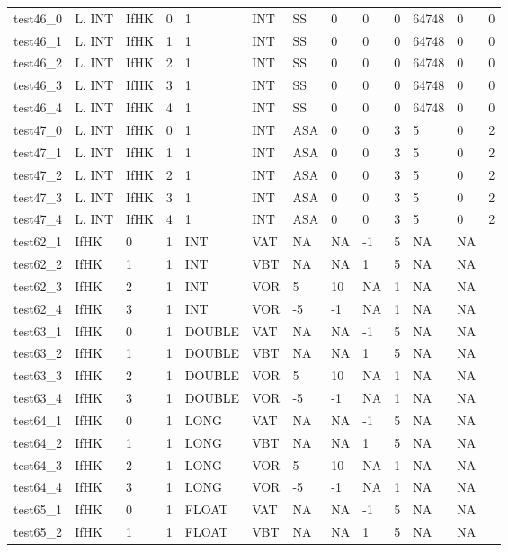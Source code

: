 \begin{longtable}{|l|l|l|p{0.5cm}|p{0.5cm}|l|p{0.5cm}|p{0.5cm}|p{0.5cm}|l|l|p{0.5cm}|l|}
test46\_0 & L. INT & IfHK & 0 & 1 & INT & SS & 0 & 0 & 0 & 64748 & 0 & 0 \\
test46\_1 & L. INT & IfHK & 1 & 1 & INT & SS & 0 & 0 & 0 & 64748 & 0 & 0 \\
test46\_2 & L. INT & IfHK & 2 & 1 & INT & SS & 0 & 0 & 0 & 64748 & 0 & 0 \\
test46\_3 & L. INT & IfHK & 3 & 1 & INT & SS & 0 & 0 & 0 & 64748 & 0 & 0 \\
test46\_4 & L. INT & IfHK & 4 & 1 & INT & SS & 0 & 0 & 0 & 64748 & 0 & 0 \\
test47\_0 & L. INT & IfHK & 0 & 1 & INT & ASA & 0 & 0 & 3 & 5 & 0 & 2 \\
test47\_1 & L. INT & IfHK & 1 & 1 & INT & ASA & 0 & 0 & 3 & 5 & 0 & 2 \\
test47\_2 & L. INT & IfHK & 2 & 1 & INT & ASA & 0 & 0 & 3 & 5 & 0 & 2 \\
test47\_3 & L. INT & IfHK & 3 & 1 & INT & ASA & 0 & 0 & 3 & 5 & 0 & 2 \\
test47\_4 & L. INT & IfHK & 4 & 1 & INT & ASA & 0 & 0 & 3 & 5 & 0 & 2 \\
test62\_1 & IfHK & 0 & 1 & INT & VAT & NA & NA & -1 & 5 & NA & NA \\
test62\_2 & IfHK & 1 & 1 & INT & VBT & NA & NA & 1 & 5 & NA & NA \\
test62\_3 & IfHK & 2 & 1 & INT & VOR & 5 & 10 & NA & 1 & NA & NA \\
test62\_4 & IfHK & 3 & 1 & INT & VOR & -5 & -1 & NA & 1 & NA & NA \\
test63\_1 & IfHK & 0 & 1 & DOUBLE & VAT & NA & NA & -1 & 5 & NA & NA \\
test63\_2 & IfHK & 1 & 1 & DOUBLE & VBT & NA & NA & 1 & 5 & NA & NA \\
test63\_3 & IfHK & 2 & 1 & DOUBLE & VOR & 5 & 10 & NA & 1 & NA & NA \\
test63\_4 & IfHK & 3 & 1 & DOUBLE & VOR & -5 & -1 & NA & 1 & NA & NA \\
test64\_1 & IfHK & 0 & 1 & LONG & VAT & NA & NA & -1 & 5 & NA & NA \\
test64\_2 & IfHK & 1 & 1 & LONG & VBT & NA & NA & 1 & 5 & NA & NA \\
test64\_3 & IfHK & 2 & 1 & LONG & VOR & 5 & 10 & NA & 1 & NA & NA \\
test64\_4 & IfHK & 3 & 1 & LONG & VOR & -5 & -1 & NA & 1 & NA & NA \\
test65\_1 & IfHK & 0 & 1 & FLOAT & VAT & NA & NA & -1 & 5 & NA & NA \\
test65\_2 & IfHK & 1 & 1 & FLOAT & VBT & NA & NA & 1 & 5 & NA & NA \\

\end{longtable}
